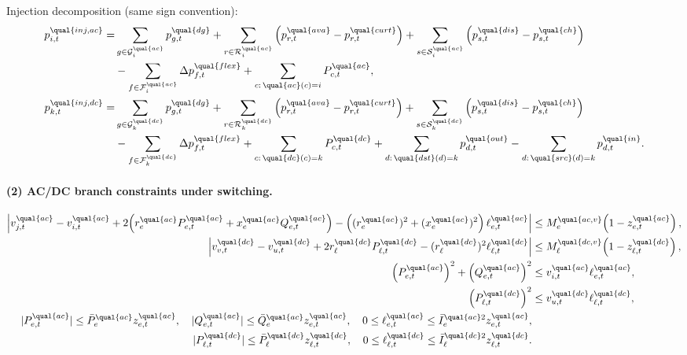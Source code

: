 Injection decomposition (same sign convention):
\begin{align}
p^{\qual{inj,ac}}_{i,t} =
&\sum_{g\in\mathcal{G}^{\qual{ac}}_i} p^{\qual{dg}}_{g,t}
+\sum_{r\in\mathcal{R}^{\qual{ac}}_i}
\left(p^{\qual{ava}}_{r,t}-p^{\qual{curt}}_{r,t}\right)
+\sum_{s\in\mathcal{S}^{\qual{ac}}_i}
\left(p^{\qual{dis}}_{s,t}-p^{\qual{ch}}_{s,t}\right) \notag\\
&-\sum_{f\in\mathcal{F}^{\qual{ac}}_i}\Delta p^{\qual{flex}}_{f,t}
+\sum_{c:\,\qual{ac}(c)=i} P^{\qual{ac}}_{c,t},
\label{eq:tstr-h-ac-inj}
\\
p^{\qual{inj,dc}}_{k,t} =
&\sum_{g\in\mathcal{G}^{\qual{dc}}_k} p^{\qual{dg}}_{g,t}
+\sum_{r\in\mathcal{R}^{\qual{dc}}_k}
\left(p^{\qual{ava}}_{r,t}-p^{\qual{curt}}_{r,t}\right)
+\sum_{s\in\mathcal{S}^{\qual{dc}}_k}
\left(p^{\qual{dis}}_{s,t}-p^{\qual{ch}}_{s,t}\right) \notag\\
&-\sum_{f\in\mathcal{F}^{\qual{dc}}_k}\Delta p^{\qual{flex}}_{f,t}
+\sum_{c:\,\qual{dc}(c)=k} P^{\qual{dc}}_{c,t}
+\sum_{d:\,\qual{dst}(d)=k} p^{\qual{out}}_{d,t}
-\sum_{d:\,\qual{src}(d)=k} p^{\qual{in}}_{d,t}.
\label{eq:tstr-h-dc-inj}
\end{align}

\paragraph{(2) AC/DC branch constraints under switching.}
\begin{align}
\left|v^{\qual{ac}}_{j,t}-v^{\qual{ac}}_{i,t}
+2\!\left(r^{\qual{ac}}_e P^{\qual{ac}}_{e,t}
+x^{\qual{ac}}_e Q^{\qual{ac}}_{e,t}\right)
-\left((r^{\qual{ac}}_e)^2+(x^{\qual{ac}}_e)^2\right)\ell^{\qual{ac}}_{e,t}
\right|
&\le M^{\qual{ac,v}}_e\!\left(1-z^{\qual{ac}}_{e,t}\right),
\label{eq:tstr-h-ac-vdrop}
\\
\left|v^{\qual{dc}}_{v,t}-v^{\qual{dc}}_{u,t}
+2r^{\qual{dc}}_\ell P^{\qual{dc}}_{\ell,t}
-(r^{\qual{dc}}_\ell)^2\ell^{\qual{dc}}_{\ell,t}
\right|
&\le M^{\qual{dc,v}}_\ell\!\left(1-z^{\qual{dc}}_{\ell,t}\right),
\label{eq:tstr-h-dc-vdrop}
\\
\left(P^{\qual{ac}}_{e,t}\right)^2+\left(Q^{\qual{ac}}_{e,t}\right)^2
&\le v^{\qual{ac}}_{i,t}\ell^{\qual{ac}}_{e,t},
\label{eq:tstr-h-ac-soc}
\\
\left(P^{\qual{dc}}_{\ell,t}\right)^2
&\le v^{\qual{dc}}_{u,t}\ell^{\qual{dc}}_{\ell,t},
\label{eq:tstr-h-dc-soc}
\\
|P^{\qual{ac}}_{e,t}| \le \bar P^{\qual{ac}}_e z^{\qual{ac}}_{e,t},
\quad
|Q^{\qual{ac}}_{e,t}| \le \bar Q^{\qual{ac}}_e z^{\qual{ac}}_{e,t},
\quad
0\le \ell^{\qual{ac}}_{e,t}\le \bar I^{\qual{ac}2}_e z^{\qual{ac}}_{e,t},
\label{eq:tstr-h-ac-bound}
\\
|P^{\qual{dc}}_{\ell,t}| \le \bar P^{\qual{dc}}_\ell z^{\qual{dc}}_{\ell,t},
\quad
0\le \ell^{\qual{dc}}_{\ell,t}\le \bar I^{\qual{dc}2}_\ell z^{\qual{dc}}_{\ell,t}.
\label{eq:tstr-h-dc-bound}
\end{align}

